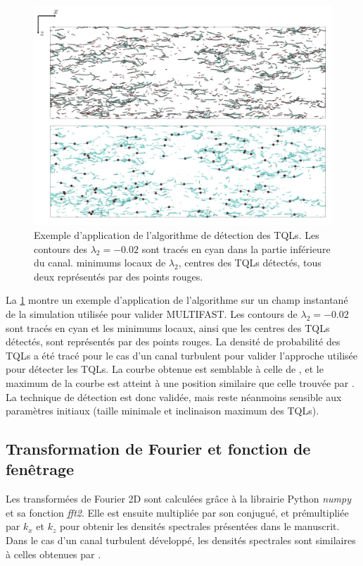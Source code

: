 \begin{figure}[!hbtp]
    \centering
    \includegraphics[width=\linewidth]{Annexes/Pictures/Annexe1/Detection_TQL.pdf}
    \caption{Exemple d'application de l'algorithme de détection des TQLs. Les contours des $\lambda_{2}=-0.02$ sont tracés en cyan dans la partie inférieure du canal.  minimums locaux de $\lambda_{2}$,  centres des TQLs détectés, tous deux représentés par des points rouges.}
    \label{fig/Detection_TQL}
\end{figure}

\clearpage
La \cref{fig/Detection_TQL} montre un exemple d'application de l'algorithme sur un champ instantané de la simulation utilisée pour valider MULTIFAST. Les contours de $\lambda_{2}=-0.02$ sont tracés en cyan et les minimums locaux, ainsi que les centres des TQLs détectés, sont représentés par des points rouges. La densité de probabilité des TQLs a été tracé pour le cas d'un canal turbulent pour valider l'approche utilisée pour détecter les TQLs. La courbe obtenue est semblable à celle de \citet{Gallorini2022}, et le maximum de la courbe est atteint à une position similaire que celle trouvée par \citet{Jeong1997}. La technique de détection est donc validée, mais reste néanmoins sensible aux paramètres initiaux (taille minimale et inclinaison maximum des TQLs). 

\subsection{Transformation de Fourier et fonction de fenêtrage}

Les transformées de Fourier 2D sont calculées grâce à la librairie Python \textit{numpy} et sa fonction \textit{fft2}. Elle est ensuite multipliée par son conjugué, et prémultipliée par $k_{x}$ et $k_{z}$ pour obtenir les densités spectrales présentées dans le manuscrit. Dans le cas d'un canal turbulent développé, les densités spectrales sont similaires à celles obtenues par \citet{Bauer_PhDThesis}.\\


